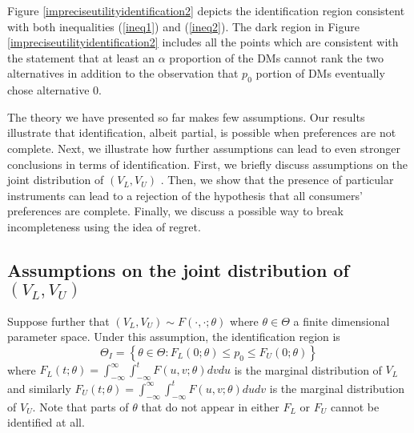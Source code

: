 \documentclass{article}
\begin{document}
Figure \ref{impreciseutilityidentification2} depicts the identification
region consistent with both inequalities (\ref{ineq1}) and (\ref{ineq2}).
The dark region in Figure \ref{impreciseutilityidentification2} includes all
the points which are consistent with the statement that at least an $\alpha $
proportion of the DMs cannot rank the two alternatives in addition to the
observation that $p_{0}$ portion of DMs eventually chose alternative $0$.

The theory we have presented so far makes few assumptions. Our results
illustrate that identification, albeit partial, is possible when preferences
are not complete. Next, we illustrate how further assumptions can lead to
even stronger conclusions in terms of identification. First, we briefly
discuss assumptions on the joint distribution of $\left( V_{L},V_{U}\right) $%
. Then, we show that the presence of particular instruments can lead to a
rejection of the hypothesis that all consumers' preferences are complete.
Finally, we discuss a possible way to break incompleteness using the idea of
regret.

\subsection{Assumptions on the joint distribution of $\left(
V_{L},V_{U}\right) $}

Suppose further that $\left( V_{L},V_{U}\right) \sim F\left( \cdot ,\cdot
;\theta \right) $ where $\theta \in \Theta $ a finite dimensional parameter
space. Under this assumption, the identification region is 
\begin{equation}
\Theta _{I}=\left\{ \theta \in \Theta :F_{L}\left( 0;\theta \right) \leq
p_{0}\leq F_{U}\left( 0;\theta \right) \right\}  \label{ID1}
\end{equation}%
where $F_{L}\left( t;\theta \right) =\int_{-\infty }^{\infty }\int_{-\infty
}^{t}F\left( u,v;\theta \right) dvdu$ is the marginal distribution of $V_{L}$
and similarly $F_{U}\left( t;\theta \right) =\int_{-\infty }^{\infty
}\int_{-\infty }^{t}F\left( u,v;\theta \right) dudv$ is the marginal
distribution of $V_{U}$. Note that parts of $\theta $ that do not appear in
either $F_{L}$ or $F_{U}$ cannot be identified at all.
\end{document}
